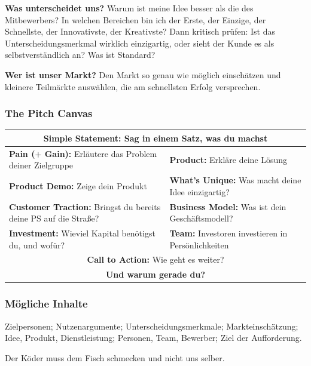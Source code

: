 \documentclass[12pt, a4paper]{article}
\begin{document}
\textbf{Was unterscheidet uns?} Warum ist meine Idee besser als die des
Mitbewerbers? In welchen Bereichen bin ich der Erste, der Einzige, der
Schnellste, der Innovativste, der Kreativste? Dann kritisch prüfen: Ist das
Unterscheidungsmerkmal wirklich einzigartig, oder sieht der Kunde es als
selbstverständlich an? Was ist Standard?

\textbf{Wer ist unser Markt?} Den Markt so genau wie möglich einschätzen und
kleinere Teilmärkte auswählen, die am schnellsten Erfolg versprechen.

\subsubsection{The Pitch Canvas}

\begin{center}
\begin{tabular}{p{}p{}}
\multicolumn{2}{c}{\textbf{Simple Statement:} Sag in einem Satz, was du
machst}\\\hline
\textbf{Pain ($+$ Gain):} Erläutere das Problem deiner Zielgruppe &
\textbf{Product:} Erkläre deine Lösung\\
\textbf{Product Demo:} Zeige dein Produkt &
\textbf{What's Unique:} Was macht deine Idee einzigartig?\\
\textbf{Customer Traction:} Bringst du bereits deine PS auf die Straße? &
\textbf{Business Model:} Was ist dein Geschäftsmodell?\\
\textbf{Investment:} Wieviel Kapital benötigst du, und wofür? &
\textbf{Team:} Investoren investieren in Persönlichkeiten\\\hline
\multicolumn{2}{c}{\textbf{Call to Action:} Wie geht es weiter?}\\\hline
\multicolumn{2}{c}{\textbf{Und warum gerade du?}}\\
\end{tabular}
\end{center}

\subsubsection{Mögliche Inhalte}

Zielpersonen; Nutzenargumente; Unterscheidungsmerkmale; Markteinschätzung;
Idee, Produkt, Dienstleistung; Personen, Team, Bewerber; Ziel der
Aufforderung.

\begin{notebox}
Der Köder muss dem Fisch schmecken und nicht uns selber.
\end{notebox}
\end{document}
